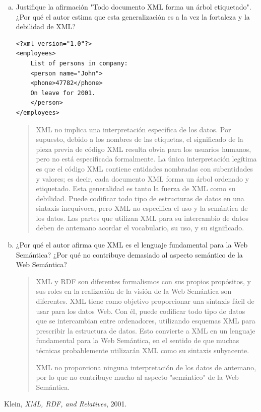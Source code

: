 \documentclass[a4paper,12pt,twoside,final,spanish]{article}
\begin{document}
\begin{enumerate}[a.]
\item Justifique la afirmación "Todo documento XML forma un árbol etiquetado". ¿Por qué el autor estima que esta generalización es a la vez la fortaleza y la debilidad de XML?

\begin{lstlisting}
<?xml version="1.0"?>
<employees>
	List of persons in company:
	<person name="John">
	<phone>47782</phone>
	On leave for 2001.
	</person>
</employees>
\end{lstlisting}

\begin{quote}
XML no implica una interpretación específica de los datos. Por supuesto, debido a los nombres de las etiquetas, el significado de la pieza previa de código XML resulta obvia para los usuarios humanos, pero no está especificada formalmente. La única interpretación legítima es que el código XML contiene entidades nombradas con subentidades y valores; es decir, cada documento XML forma un árbol ordenado y etiquetado. Esta generalidad es tanto la fuerza de XML como su debilidad. Puede codificar todo tipo de estructuras de datos en una sintaxis inequívoca, pero
XML no especifica el uso y la semántica de los datos. Las partes que utilizan XML para su intercambio de datos deben de antemano acordar el vocabulario, su uso, y su significado.
\end{quote}

\item ¿Por qué el autor afirma que XML es el lenguaje fundamental para la Web Semántica? ¿Por qué no contribuye demasiado al aspecto semántico de la Web Semántica?

\begin{quote}
XML y RDF son diferentes formalismos con sus propios propósitos, y sus roles en la realización de la visión de la Web Semántica son diferentes. XML tiene como objetivo proporcionar una sintaxis fácil de usar para los datos Web. Con él, puede codificar todo tipo de datos que se intercambian entre ordenadores, utilizando esquemas XML para prescribir la estructura de datos.
Esto convierte a XML en un lenguaje fundamental para la Web Semántica, en el sentido de que muchas técnicas probablemente utilizarán XML como su sintaxis subyacente.

XML no proporciona ninguna interpretación de los datos de antemano, por lo que no contribuye mucho al aspecto "semántico" de la Web Semántica.
\end{quote}
 
\end{enumerate} 

\begin{thebibliography}{1} 
Klein,
\emph{XML, RDF, and Relatives},
2001.
\end{thebibliography}
\end{document}
